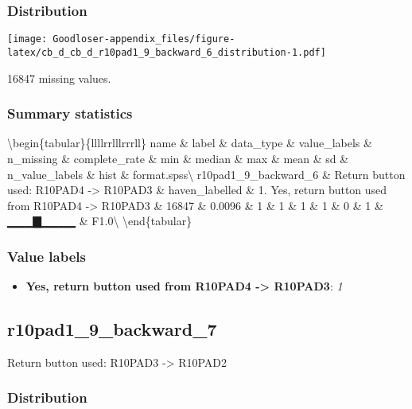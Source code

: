 \documentclass[
]{book}
\providecommand{\tightlist}{%
  \setlength{\itemsep}{0pt}\setlength{\parskip}{0pt}}
\begin{document}
\hypertarget{r10pad1_9_backward_6_distribution}{%
\subsubsection{Distribution}\label{r10pad1_9_backward_6_distribution}}

\texttt{[image: Goodloser-appendix\_files/figure-latex/cb\_d\_cb\_d\_r10pad1\_9\_backward\_6\_distribution-1.pdf]}

16847 missing values.

\hypertarget{r10pad1_9_backward_6_summary}{%
\subsubsection{Summary statistics}\label{r10pad1_9_backward_6_summary}}

\textbackslash begin\{tabular\}\{l\textbar l\textbar l\textbar l\textbar r\textbar r\textbar l\textbar l\textbar l\textbar r\textbar r\textbar r\textbar l\textbar l\}
\hline
name \& label \& data\_type \& value\_labels \& n\_missing \& complete\_rate \& min \& median \& max \& mean \& sd \& n\_value\_labels \& hist \& format.spss\textbackslash{}
\hline
r10pad1\_9\_backward\_6 \& Return button used: R10PAD4 -\textgreater{} R10PAD3 \& haven\_labelled \& 1. Yes, return button used from R10PAD4 -\textgreater{} R10PAD3 \& 16847 \& 0.0096 \& 1 \& 1 \& 1 \& 1 \& 0 \& 1 \& ▁▁▁▇▁▁▁▁ \& F1.0\textbackslash{}
\hline
\textbackslash end\{tabular\}

\hypertarget{r10pad1_9_backward_6_labels}{%
\subsubsection{Value labels}\label{r10pad1_9_backward_6_labels}}

\begin{itemize}
\tightlist
\item
  \textbf{Yes, return button used from R10PAD4 -\textgreater{} R10PAD3}: \emph{1}
\end{itemize}

\hypertarget{r10pad1_9_backward_7}{%
\subsection{r10pad1\_9\_backward\_7}\label{r10pad1_9_backward_7}}

Return button used: R10PAD3 -\textgreater{} R10PAD2

\hypertarget{r10pad1_9_backward_7_distribution}{%
\subsubsection{Distribution}\label{r10pad1_9_backward_7_distribution}}
\end{document}
